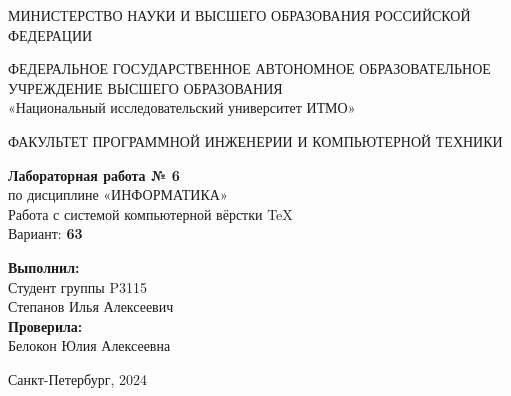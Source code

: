 \documentclass{article}
\begin{document}
\begin{center}
    МИНИСТЕРСТВО НАУКИ И ВЫСШЕГО ОБРАЗОВАНИЯ РОССИЙСКОЙ ФЕДЕРАЦИИ

    \vspace{1em}
    ФЕДЕРАЛЬНОЕ ГОСУДАРСТВЕННОЕ АВТОНОМНОЕ ОБРАЗОВАТЕЛЬНОЕ УЧРЕЖДЕНИЕ ВЫСШЕГО ОБРАЗОВАНИЯ\\
    {\Large «Национальный исследовательский университет ИТМО»}

    \vspace{4em}
    ФАКУЛЬТЕТ ПРОГРАММНОЙ ИНЖЕНЕРИИ И КОМПЬЮТЕРНОЙ ТЕХНИКИ

    \vspace{16em}
    
    {\Large \textbf{Лабораторная работа № 6}}\\[1em]
    {\Large по дисциплине «ИНФОРМАТИКА»}\\[1em]
    {Работа с системой компьютерной вёрстки \TeX}\\[1em]
    Вариант:  \textbf{63}
\end{center}

\vspace{9em}

\begin{flushright}
    \textbf{Выполнил:} \\
    Студент группы P3115 \\
    Степанов Илья Алексеевич\\
    \textbf{Проверила:} \\
    Белокон Юлия Алексеевна \\
\end{flushright}
\vspace{8em}

\begin{center}
Санкт-Петербург, 2024
\end{center}
\end{document}

